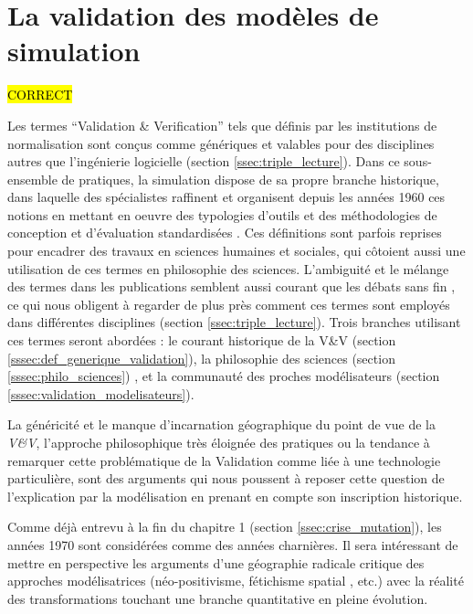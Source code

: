 
\section{La validation des modèles de simulation}
\label{sec:constante_problematique}

\hl{CORRECT}

Les termes \foreignquote{english}{Validation \& Verification} tels que définis par les institutions de normalisation sont conçus comme génériques et valables pour des disciplines autres que l'ingénierie logicielle (section \ref{ssec:triple_lecture}). Dans ce sous-ensemble de pratiques, la simulation dispose de sa propre branche historique, dans laquelle des spécialistes raffinent et organisent depuis les années 1960 ces notions en mettant en oeuvre des typologies d'outils et des méthodologies de conception et d'évaluation standardisées \autocite{Nance2002}. Ces définitions sont parfois reprises pour encadrer des travaux en sciences humaines et sociales, qui côtoient aussi une utilisation de ces termes en philosophie des sciences. L'ambiguité et le mélange des termes dans les publications semblent aussi courant que les débats sans fin \autocites{David2009,Augusiak2014}, ce qui nous obligent à regarder de plus près comment ces termes sont employés dans différentes disciplines (section \ref{ssec:triple_lecture}). Trois branches utilisant ces termes seront abordées : le courant historique de la V\&V (section \ref{sssec:def_generique_validation}), la philosophie des sciences (section \ref{sssec:philo_sciences}) , et la communauté des proches modélisateurs (section \ref{sssec:validation_modelisateurs}).


La généricité et le manque d'incarnation géographique du point de vue de la \textit{V\&V}, l'approche philosophique très éloignée des pratiques ou la tendance à remarquer cette problématique de la Validation comme liée à une technologie particulière, sont des arguments qui nous poussent à reposer cette question de l'explication par la modélisation en prenant en compte son inscription historique.

Comme déjà entrevu à la fin du chapitre 1 (section \ref{ssec:crise_mutation}), les années 1970 sont considérées comme des années charnières. Il sera intéressant de mettre en perspective les arguments d'une géographie radicale critique des approches modélisatrices (néo-positivisme, fétichisme spatial , etc.) avec la réalité des transformations touchant une branche quantitative en pleine évolution.

